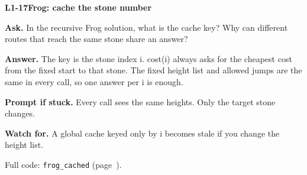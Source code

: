 \documentclass[11pt,a4paper]{article}
\begin{document}
\noindent\begin{minipage}{\textwidth}
{\color{teal}\textbf{L1-17}}\quad \textbf{Frog: cache the stone number}\par\smallskip
\textbf{Ask.} In the recursive Frog solution, what is the cache key? Why can different routes that reach the same stone share an answer?\par\smallskip
\textbf{Answer.} The key is the stone index i. cost(i) always asks for the cheapest cost from the fixed start to that stone. The fixed height list and allowed jumps are the same in every call, so one answer per i is enough.\par\smallskip
\textbf{Prompt if stuck.} Every call sees the same heights. Only the target stone changes.\par\smallskip
\textbf{Watch for.} A global cache keyed only by i becomes stale if you change the height list.\par\smallskip Full code: \texttt{frog\_cached} (page~\pageref{L1-code-frog_cached}).
\end{minipage}\par{}\medskip
\end{document}
